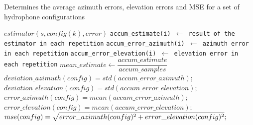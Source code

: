 \begin{algorithm}
	\scriptsize		%
	\caption{Determines the average azimuth errors, elevation errors and MSE for a set of hydrophone configurations}
	\label{alg:alg1}
	\begin{algorithmic}[1]
		\STATE\texttt{$estimator(s, config(k), error)$}
		\STATE \texttt{accum\_estimate(i) $\gets$ result of the estimator in each repetition} 
		\STATE \texttt{accum\_error\_azimuth(i) $\gets$ azimuth error in each repetition} 
		\STATE \texttt{accum\_error\_elevation(i) $\gets$ elevation error in each repetition} 
		\ENDFOR
		\STATE $mean\_estimate \gets \dfrac{accum\_estimate}{accum\_samples}$
		\STATE
		\STATE $deviation\_azimuth(config) = std(accum\_error\_azimuth);$
		\STATE $deviation\_elevation(config) = std(accum\_error\_elevation);$
		\STATE $error\_azimuth(config) = mean(accum\_error\_azimuth);$
		\STATE $error\_elevation(config) = mean(accum\_error\_elevation);$
		\STATE
		\STATE $mse(config) = \sqrt{\rule{0pt}{8pt}error\_azimuth(config)^{2} + error\_elevation(config)^{2}};$
		\ENDFOR
	\end{algorithmic}
\end{algorithm}

